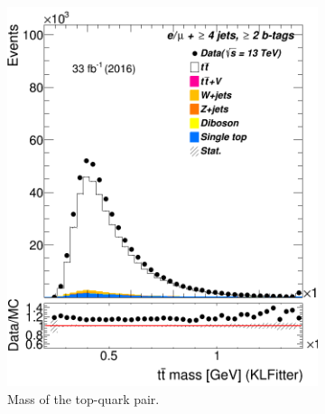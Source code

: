 \begin{figure}
\begin{subfigure}{0.35\textwidth}
		\includegraphics[width=\linewidth]{ControlPlots_emujets_2016_4incl_2incl/klf_ttbar_m_emujets_2016.png}
		\caption{Mass of the top-quark pair.} \label{fig:31}
	\end{subfigure}
	\hspace*{1.5cm}
	\begin{subfigure}{0.35\textwidth}

\end{subfigure}
\end{figure}
